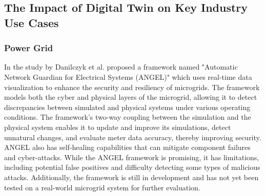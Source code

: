 




\subsection{The Impact of Digital Twin on Key Industry Use Cases}

\subsubsection{Power Grid}
In the study by Danilczyk et al.\cite{williamdanilczykANGELIntelligentDigital2019} proposed a framework named "Automatic Network Guardian for Electrical Systems (ANGEL)" which uses real-time data visualization to enhance the security and resiliency of microgrids. The framework models both the cyber and physical layers of the microgrid, allowing it to detect discrepancies between simulated and physical systems under various operating conditions. The framework's two-way coupling between the simulation and the physical system enables it to update and improve its simulations, detect unnatural changes, and evaluate meter data accuracy, thereby improving security. ANGEL also has self-healing capabilities that can mitigate component failures and cyber-attacks. While the ANGEL framework is promising, it has limitations, including potential false positives and difficulty detecting some types of malicious attacks. Additionally, the framework is still in development and has not yet been tested on a real-world microgrid system for further evaluation.

